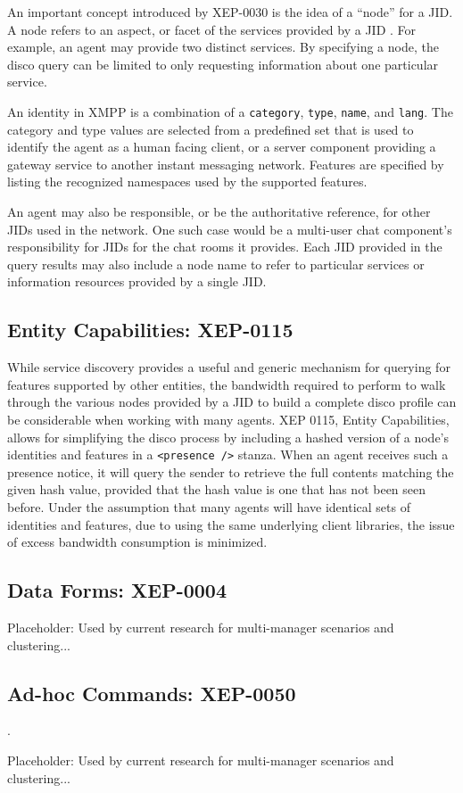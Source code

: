 An important concept introduced by XEP-0030 is the idea of a ``node'' for a
JID. A node refers to an aspect, or facet of the services provided by a JID
\cite{XEP-0030}. For example, an agent may provide two distinct services. By
specifying a node, the disco query can be limited to only requesting information
about one particular service.

An identity in XMPP is a combination of a \texttt{category}, \texttt{type},
\texttt{name}, and \texttt{lang}. The category and type values are selected from
a predefined set that is used to identify the agent as a human facing client,
or a server component providing a gateway service to another instant messaging
network. Features are specified by listing the recognized namespaces used by the
supported features.

An agent may also be responsible, or be the authoritative reference, for other
JIDs used in the network. One such case would be a multi-user chat component's
responsibility for JIDs for the chat rooms it provides. Each JID provided in the
query results may also include a node name to refer to particular services or
information resources provided by a single JID.

\subsection{Entity Capabilities: XEP-0115}
\label{sec:Entity-Capabilities}

While service discovery provides a useful and generic mechanism for querying
for features supported by other entities, the bandwidth required to perform
to walk through the various nodes provided by a JID to build a complete disco
profile can be considerable when working with many agents. XEP 0115, Entity
Capabilities, allows for simplifying the disco process by including a hashed
version of a node's identities and features in a \texttt{<presence />} stanza.
When an agent receives such a presence notice, it will query the sender to
retrieve the full contents matching the given hash value, provided that the
hash value is one that has not been seen before. Under the assumption that many
agents will have identical sets of identities and features, due to using the
same underlying client libraries, the issue of excess bandwidth consumption is
minimized.

\subsection{Data Forms: XEP-0004}
\label{sec:Data-Forms}

Placeholder: Used by current research for multi-manager scenarios and clustering...


\subsection{Ad-hoc Commands: XEP-0050}.
\label{sec:Adhoc-Commands}

Placeholder: Used by current research for multi-manager scenarios and clustering...
